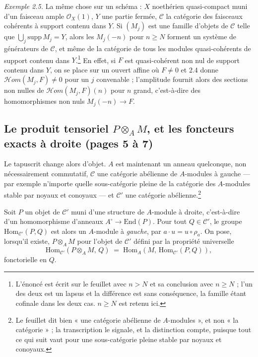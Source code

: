 \documentclass[11pt,a4paper]{article}
\begin{document}
\emph{Exemple 2.5.} La même chose sur un schéma : $X$ noethérien
quasi-compact muni d'un faisceau ample $\mathcal{O}_{X}(1)$, $Y$ une partie
fermée, $\mathcal{C}$ la catégorie des faisceaux cohérents à support contenu
dans $Y$. Si $(M_{j})$ est une famille d'objets de $\mathcal{C}$ telle que
$\bigcup_{j} \mathrm{supp}\, M_{j} = Y$, alors les $M_{j}(-n)$ pour $n \geqslant
N$ forment un système de générateurs de $\mathcal{C}$, et même de la catégorie
de tous les modules quasi-cohérents de support contenu dans
$Y$.\footnote{L'énoncé est écrit sur le feuillet avec $n > N$ et sa conclusion
avec $n \geqslant N$ ; l'un des deux est un lapsus et la différence est sans
conséquence, la famille étant cofinale dans les deux cas. $n \geqslant N$ est
retenu ici.} En effet, si $F$ est quasi-cohérent non nul de support contenu dans
$Y$, on se place sur un ouvert affine où $F \neq 0$ et 2.4 donne
$\mathcal{H}om(M_{j},F) \neq 0$ pour un $j$ convenable ; l'amplitude fournit
alors des sections non nulles de $\mathcal{H}om(M_{j},F)(n)$ pour $n$ grand,
c'est-à-dire des homomorphismes non nuls $M_{j}(-n) \to F$.

\subsection*{Le produit tensoriel $P \otimes_A M$, et les foncteurs exacts à droite (pages 5 à 7)}

Le tapuscrit change alors d'objet. $A$ est maintenant un anneau quelconque, non
nécessairement commutatif, $\mathcal{C}$ une catégorie abélienne de
$A$-modules à gauche — par exemple n'importe quelle sous-catégorie pleine de la
catégorie des $A$-modules stable par noyaux et conoyaux — et $\mathcal{C}'$ une
catégorie abélienne.\footnote{Le feuillet dit bien « une catégorie abélienne de
$A$-modules », et non « la catégorie » ; la transcription le signale, et la
distinction compte, puisque tout ce qui suit vaut pour une sous-catégorie
pleine stable par noyaux et conoyaux.}

Soit $P$ un objet de $\mathcal{C}'$ muni d'une structure de $A$-module à droite,
c'est-à-dire d'un homomorphisme d'anneaux $A^{\circ} \to \mathrm{End}(P)$. Pour
tout $Q \in \mathcal{C}'$, le groupe $\mathrm{Hom}_{\mathcal{C}'}(P,Q)$ est
alors un $A$-module à \emph{gauche}, par $a \cdot u = u \circ \rho_{a}$. On pose,
lorsqu'il existe, $P \otimes_{A} M$ pour l'objet de $\mathcal{C}'$ défini par la
propriété universelle
\[
  \mathrm{Hom}_{\mathcal{C}'}(P \otimes_{A} M,\, Q)
  \;=\;
  \mathrm{Hom}_{A}(M,\, \mathrm{Hom}_{\mathcal{C}'}(P,Q)) ,
\]
fonctorielle en $Q$.
\end{document}
